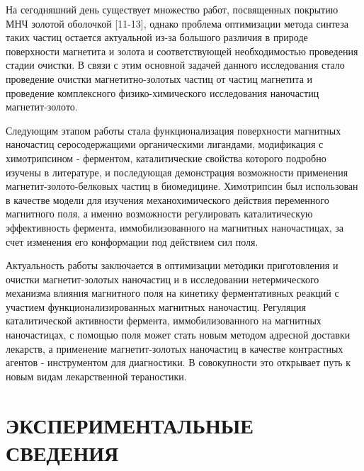 \documentclass[10pt, a4paper]{article}
\begin{document}
  На сегодняшний день существует множество работ, посвященных покрытию МНЧ золотой оболочкой [11-13], однако проблема
  оптимизации метода синтеза таких частиц остается актуальной из-за большого различия в природе поверхности магнетита и золота и соответствующей необходимостью проведения стадии очистки. 
  В связи с этим основной задачей данного исследования стало проведение очистки магнетитно-золотых частиц от частиц магнетита и проведение комплексного
  физико-химического исследования наночастиц магнетит-золото.
  
  Следующим этапом работы стала функционализация поверхности магнитных наночастиц серосодержащими органическими
  лигандами, модификация с химотрипсином - ферментом, каталитические свойства которого подробно изучены в литературе, и
  последующая демонстрация возможности применения магнетит-золото-белковых частиц в биомедицине. Химотрипсин был
  использован в качестве модели для изучения механохимического действия переменного магнитного поля, а именно возможности регулировать
  каталитическую эффективность фермента, иммобилизованного на магнитных наночастицах, за счет изменения его конформации под
  действием сил поля.
  
  Актуальность работы заключается в оптимизации методики приготовления и очистки магнетит-золотых наночастиц и в исследовании нетермического механизма влияния магнитного поля на кинетику
  ферментативных реакций с участием функционализированных магнитных наночастиц. Регуляция каталитической активности
  фермента, иммобилизованного на магнитных наночастицах, с помощью поля может стать новым методом адресной доставки лекарств, а
  применение магнетит-золотых наночастиц в качестве контрастных агентов - инструментом для диагностики. В совокупности это открывает
  путь к новым видам лекарственной тераностики.
  
\section*{ЭКСПЕРИМЕНТАЛЬНЫЕ СВЕДЕНИЯ}
\end{document}

